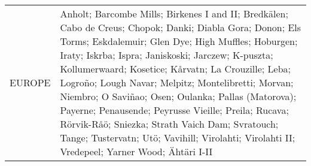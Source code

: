 \begin{table}
\begin{tabularx}{\textwidth}{lX}
  EUROPE   & Anholt; Barcombe Mills; Birkenes I and II; Bredkälen; Cabo de Creus; Chopok; Danki; Diabla Gora; Donon; Els Torms; Eskdalemuir; Glen Dye; High Muffles; Hoburgen; Iraty; Iskrba; Ispra; Janiskoski; Jarczew; K-puszta; Kollumerwaard; Kosetice; Kårvatn; La Crouzille; Leba; Logroño; Lough Navar; Melpitz; Montelibretti; Morvan; Niembro; O Saviñao; Osen; Oulanka; Pallas (Matorova); Payerne; Penausende; Peyrusse Vieille; Preila; Rucava; Rörvik-Råö; Sniezka; Strath Vaich Dam; Svratouch; Tange; Tustervatn; Utö; Vavihill; Virolahti; Virolahti II; Vredepeel; Yarner Wood; Ähtäri I-II                                                                                                                                                                                                                                                                                                                                                                                                                                                                                                                                                                                                                                                                                                                                                                                                                                                                                                                                                                                                                                                                                                                                                                                                                                                                                                                                                                                                                                                                                                                                                                                                                                                                                                                                                                                                                                                                                                                                                                                                                                                                                                                                                                                                                                                                                                                                                                                                                                                                                                                                                                                                                                                                                                                                                                                                            
\end{tabularx}
\end{table}
